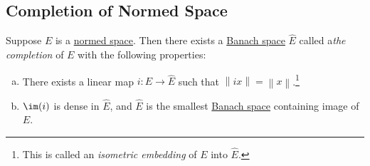 \subsection{Completion of Normed Space}

\begin{theorem}[Completion]
	Suppose \(E\) is a \hyperref[def:normed-vector-space]{normed space}. Then there exists a \hyperref[def:Banach-space]{Banach space} \(\hat{E} \) called a\emph{the completion} of \(E\) with the following properties:
	\begin{enumerate}[(a)]
		\item There exists a linear map \(i\colon E \to \hat{E}\) such that \(\left\lVert ix\right\rVert = \left\lVert x\right\rVert \).\footnote{This is called an \emph{isometric embedding} of \(E\) into \(\hat{E} \).}
		\item \(\im(i)\) is dense in \(\hat{E} \), and \(\hat{E} \) is the smallest \hyperref[def:Banach-space]{Banach space} containing image of \(E\).
	\end{enumerate}
\end{theorem}
